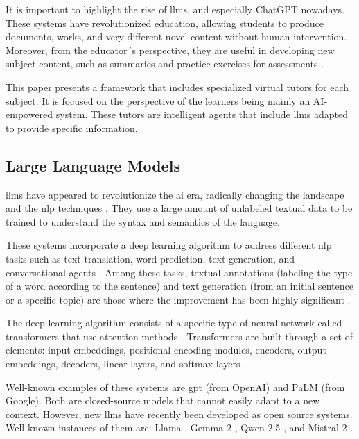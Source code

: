 \documentclass[pdflatex,sn-mathphys-num]{sn-jnl}%
\begin{document}
It is important to highlight the rise of \acp{llm}, and especially ChatGPT \cite{kasneci2023chatgpt} nowadays. These systems have revolutionized education, allowing students to produce documents, works, and very different novel content without human intervention. Moreover, from the educator´s perspective, they are useful in developing new subject content, such as summaries and practice exercises for assessments \cite{orenstrakh2023detecting}.

This paper presents a framework that includes specialized virtual tutors for each subject. It is focused on the perspective of the learners being mainly an AI-empowered system. These tutors are intelligent agents that include \acp{llm} adapted to provide specific information.


\subsection{Large Language Models}
\label{sec:llm}
\acp{llm} have appeared to revolutionize the \ac{ai} era, radically changing the landscape and the \ac{nlp} techniques \cite{hadi2023large}. They use a large amount of unlabeled textual data to be trained to understand the syntax and semantics of the language.

These systems incorporate a deep learning algorithm to address different \ac{nlp} tasks such as text translation, word prediction, text generation, and conversational agents \cite{zhao2023survey}. Among these tasks, textual annotations (labeling the type of a word according to the sentence) \cite{he2023annollm} and text generation (from an initial sentence or a specific topic) are those where the improvement has been highly significant \cite{min2023recent}.

The deep learning algorithm consists of a specific type of neural network called transformers that use attention methods \cite{niu2021review}. Transformers are built through a set of elements: input embeddings, positional encoding modules, encoders, output embeddings, decoders, linear layers, and softmax layers \cite{vaswani2017attention}.

Well-known examples of these systems are \ac{gpt} \cite{floridi2020gpt} (from OpenAI) and PaLM \cite{anil2023palm} (from Google). Both are closed-source models that cannot easily adapt to a new context. However, new \acp{llm} have recently been developed as open source systems. Well-known instances of them are: Llama \cite{lu2023llama}, Gemma 2 \cite{team2024gemma}, Qwen 2.5 \cite{hui2024qwen2}, and Mistral 2 \cite{jiang2023mistral}.
\end{document}
